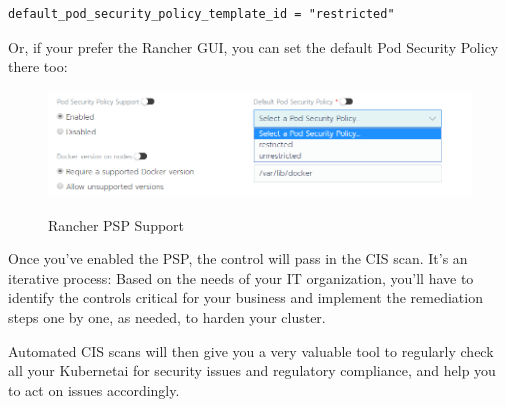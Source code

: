 \begin{lstlisting}[caption=Cluster Template, frame=single, basicstyle=\ttfamily]
default_pod_security_policy_template_id = "restricted"
\end{lstlisting}

Or, if your prefer the Rancher GUI, you can set the default Pod Security Policy there too:

\begin{figure}[H]
\centering
\caption {Rancher PSP Support}
\includegraphics[width=\linewidth]{images/rancher-psp-support.png}
\label{fig:rancherPSP}
\end{figure}

Once you've enabled the PSP, the control will pass in the CIS scan. It's an iterative process: Based on the needs of your IT organization, you'll have to identify the controls critical for your business and implement the remediation steps one by one, as needed, to harden your cluster.

Automated CIS scans will then give you a very valuable tool to regularly check all your Kubernetai for security issues and regulatory compliance, and help you to act on issues accordingly.
